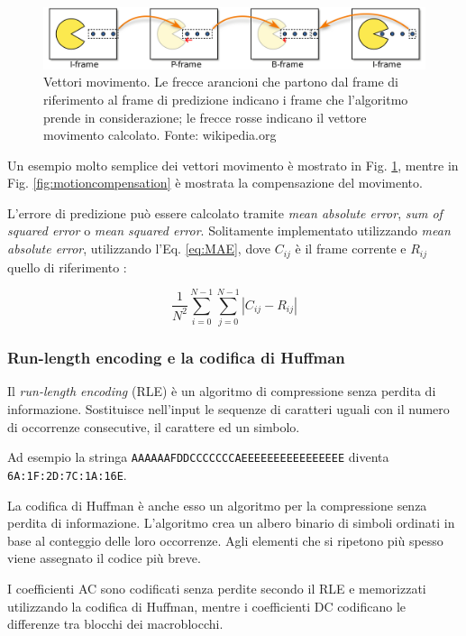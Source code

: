 \begin{figure}[H]
	\includegraphics[width=\linewidth]{immagini/I_P_and_B_frames}
	\caption{Vettori movimento. Le frecce arancioni che partono dal frame di riferimento al frame di predizione indicano i frame che l'algoritmo prende in considerazione; le frecce rosse indicano il vettore movimento calcolato. Fonte: wikipedia.org}
	\label{fig:I_P_and_B_frames}
\end{figure}

Un esempio molto semplice dei vettori movimento è mostrato in Fig. \ref{fig:I_P_and_B_frames}, mentre in Fig. \ref{fig:motioncompensation} è mostrata la compensazione del movimento.

L'errore di predizione può essere calcolato tramite \textit{mean absolute error}, \textit{sum of squared error} o \textit{mean squared error}. Solitamente implementato utilizzando \textit{mean absolute error}, utilizzando l'Eq. \ref{eq:MAE}, dove $C_{ij}$ è il frame corrente e $R_{ij}$ quello di riferimento \parencite{ProgettazioneEproduzioneMultimediale}:

\begin{equation} \label{eq:MAE}
	\frac{1}{N^2} \sum_{i=0}^{N-1} \sum_{j=0}^{N-1} |C_{ij}-R_{ij}|
\end{equation}



\subsubsection{Run-length encoding e la codifica di Huffman}
Il \textit{run-length encoding} (RLE) è un algoritmo di compressione senza perdita di informazione. Sostituisce nell'input le sequenze di caratteri uguali con il numero di occorrenze consecutive, il carattere ed un simbolo.

Ad esempio la stringa \verb|AAAAAAFDDCCCCCCCAEEEEEEEEEEEEEEEE| diventa \verb|6A:1F:2D:7C:1A:16E|.

La codifica di Huffman è anche esso un algoritmo per la compressione senza perdita di informazione. L'algoritmo crea un albero binario di simboli ordinati in base al conteggio delle loro occorrenze. Agli elementi che si ripetono più spesso viene assegnato il codice più breve.

I coefficienti AC sono codificati senza perdite secondo il RLE e memorizzati utilizzando la codifica di Huffman, mentre i coefficienti DC codificano le differenze tra blocchi dei macroblocchi.

